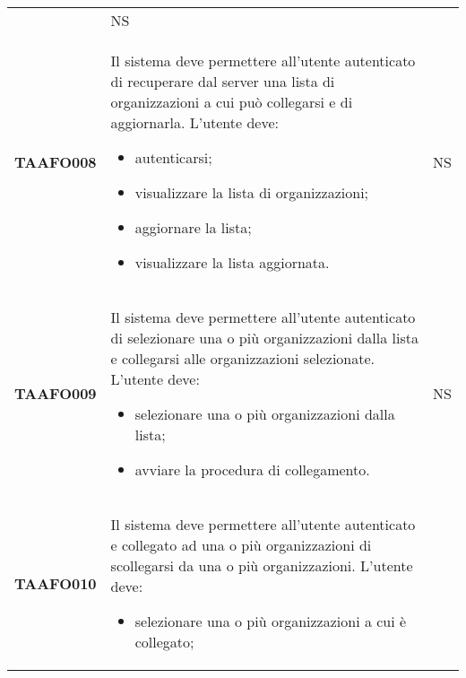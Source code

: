 \documentclass[../piano-di-qualifica.tex]{subfiles}
\begin{document}
\begin{longtable}[H]{>{\centering\bfseries}m{3cm} >{}m{11cm} >{\centering\arraybackslash}m{2cm}}
\begin{itemize}
  \end{itemize}
                                  & NS                                                                                                                                                                                                                                   \\
  TAAFO008                        & Il sistema deve permettere all’utente autenticato di recuperare dal server una lista di organizzazioni a cui può collegarsi e di aggiornarla. \newline
  L’utente deve:
  \begin{itemize}
    \item autenticarsi;
    \item visualizzare la lista di organizzazioni;
    \item aggiornare la lista;
    \item visualizzare la lista aggiornata.
  \end{itemize}
                                  & NS                                                                                                                                                                                                                                   \\
  TAAFO009                        & Il sistema deve permettere all’utente autenticato di selezionare una o più organizzazioni dalla lista e collegarsi alle organizzazioni selezionate. \newline
  L’utente deve:
  \begin{itemize}
    \item selezionare una o più organizzazioni dalla lista;
    \item avviare la procedura di collegamento.
  \end{itemize}
                                  & NS                                                                                                                                                                                                                                   \\
  TAAFO010                        & Il sistema deve permettere all’utente autenticato e collegato ad una o più organizzazioni di scollegarsi da una o più organizzazioni. \newline
  L’utente deve:
  \begin{itemize}
    \item selezionare una o più organizzazioni a cui è collegato;

\end{itemize}
\end{longtable}
\end{document}
